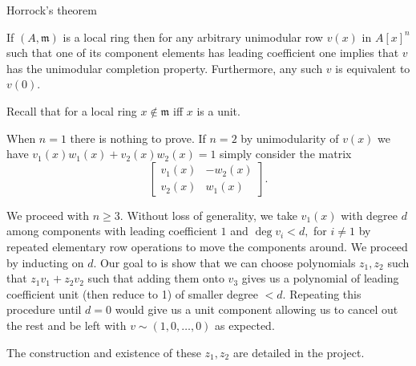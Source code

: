 \documentclass{beamer}
\begin{document}
\begin{frame}[allowframebreaks]{Horrock's theorem}
		\begin{theorem}
		If $(A, \mathfrak{m})$ is a local ring then for any arbitrary unimodular row $v(x)$ in $A[x]^n$ such that one of its component elements has leading coefficient one implies that $v$ has the unimodular completion property. Furthermore, any such $v$ is equivalent to $v(0)$.
	\end{theorem}
	Recall that for a local ring $x \not \in \mathfrak m$ iff $ x  $ is a unit.
	
	When $n=1 $ there is nothing to prove. If $n=2$ by unimodularity of $v(x)$ we have $v_1(x)w_1(x)+v_2(x)w_2(x)=1$ simply consider the matrix
	\[ \begin{bmatrix}
		v_1(x) & -w_2(x)\\
		v_2(x) & w_1(x)
	\end{bmatrix}. \]
	
	We proceed with $n \geq 3$.
	Without loss of generality, we take $v_1(x)$ with degree $d $ among components with leading coefficient $1$ and $\deg v_i < d, $ for $i \neq 1$ by repeated elementary row operations to move the components around. We proceed by inducting on $d$.
	 Our goal to is show that we can choose polynomials $z_1, z_2$ such that $z_1v_1+z_2v_2$ such that adding them onto $v_3$ gives us a polynomial of leading coefficient unit (then reduce to 1) of smaller degree $<d$. Repeating this procedure until $d=0$ would give us a unit component allowing us to cancel out the rest and be left with $v\sim (1,0,\dots,0)$ as expected.
	 
	 The construction and existence of these $z_1,z_2 $ are detailed in the project.
\end{frame}
\end{document}

